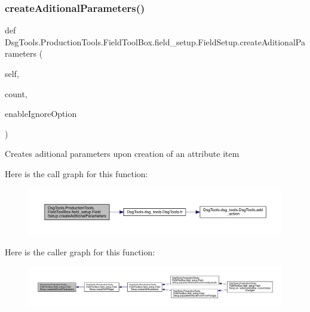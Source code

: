\subsubsection{\texorpdfstring{create\+Aditional\+Parameters()}{createAditionalParameters()}}
{\footnotesize\ttfamily def Dsg\+Tools.\+Production\+Tools.\+Field\+Tool\+Box.\+field\+\_\+setup.\+Field\+Setup.\+create\+Aditional\+Parameters (\begin{DoxyParamCaption}\item[{}]{self,  }\item[{}]{count,  }\item[{}]{enable\+Ignore\+Option }\end{DoxyParamCaption})}

\begin{DoxyVerb}Creates aditional parameters upon creation of an attribute item
\end{DoxyVerb}
 Here is the call graph for this function\+:
\nopagebreak
\begin{figure}[H]
\begin{center}
\leavevmode
\includegraphics[width=350pt]{class_dsg_tools_1_1_production_tools_1_1_field_tool_box_1_1field__setup_1_1_field_setup_ab7386e843a6d814917643eb7439388ed_cgraph}
\end{center}
\end{figure}
Here is the caller graph for this function\+:
\nopagebreak
\begin{figure}[H]
\begin{center}
\leavevmode
\includegraphics[width=350pt]{class_dsg_tools_1_1_production_tools_1_1_field_tool_box_1_1field__setup_1_1_field_setup_ab7386e843a6d814917643eb7439388ed_icgraph}
\end{center}
\end{figure}
\mbox{\label{class_dsg_tools_1_1_production_tools_1_1_field_tool_box_1_1field__setup_1_1_field_setup_a85658685ed7ca0f73f76781de8fde63b}} 
